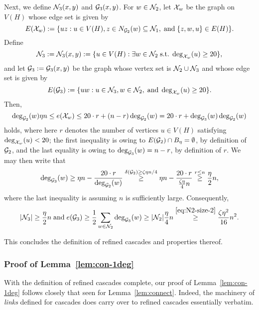 \documentclass[11pt,reqno]{amsart}
\begin{document}
Next, we define $\mathcal{N}_3(x,y)$ and $\mathcal{G}_3(x,y)$.
For $w \in \mathcal{N}_2$, let $\mathcal{X}_w$ be the graph on $V(H)$ whose edge set is given by 
$$
E(\mathcal{X}_w) := \{uz: u \in V(H), z \in N_{\mathcal{G}_2}(w) \subseteq \mathcal{N}_1, \; \text{and}\; \{z,w,u\}\in E(H)\}. 
$$ 
Define 
$$
\mathcal{N}_3:= \mathcal{N}_3(x,y) := \{u \in V(H): \exists w \in \mathcal{N}_2\; \text{s.t.} \; \deg_{\mathcal{X}_w}(u)\geq 20\},
$$
and let $\mathcal{G}_3:=\mathcal{G}_3(x,y)$ be the graph whose vertex set is $\mathcal{N}_2 \cup \mathcal{N}_3$ and whose edge set is given by 
$$
E(\mathcal{G}_3) := \{uw: u \in \mathcal{N}_3, w \in \mathcal{N}_2, \; \text{and}\; \deg_{\mathcal{X}_w}(u) \geq 20\}.
$$
Then,
$$
\deg_{\mathcal{G}_2}(w) \eta n \leq e(\mathcal{X}_w) \leq 20 \cdot r + (n-r) \deg_{\mathcal{G}_2}(w) = 20 \cdot r + \deg_{\mathcal{G}_3}(w)\deg_{\mathcal{G}_2}(w)
$$
holds, where here $r$ denotes the number of vertices $u \in V(H)$ satisfying $\deg_{\mathcal{X}_w}(u) < 20$; the first inequality is owing to $E(\mathcal{G}_2) \cap B_\eta =\emptyset$, by definition of $\mathcal{G}_2$, and the last equality is owing to $\deg_{\mathcal{G}_3}(w)=n-r$, by definition of $r$. We may then write that 
$$
\deg_{\mathcal{G}_3}(w) \geq \eta n - \frac{20\cdot r}{\deg_{\mathcal{G}_2}(w)} \overset{\delta(\mathcal{G}_2) \geq \zeta\eta n/4}{\geq} \eta n - \frac{20\cdot r}{\frac{\zeta \eta}{4} n} \overset{r \leq n}{\geq} \frac{\eta}{2} n,
$$ 
where the last inequality is assuming $n$ is sufficiently large. Consequently,
\begin{equation}\label{eq:G3-size-2}
|\mathcal{N}_3| \geq \frac{\eta}{2} n \; \text{and}\; e(\mathcal{G}_3) \geq \frac{1}{2} \sum_{w \in \mathcal{N}_2} \deg_{\mathcal{G}_3}(w) \geq |\mathcal{N}_2| \frac{\eta}{4}n \overset{\eqref{eq:N2-size-2}}{\geq} \frac{\zeta \eta^2}{16}{n^2}. 
\end{equation}



This concludes the definition of refined cascades and properties thereof. 


\subsubsection{Proof of Lemma~\ref{lem:con-1deg}}

With the definition of refined cascades complete, our proof of Lemma~\ref{lem:con-1deg} follows closely that seen for Lemma~\ref{lem:connect}.  Indeed, the machinery of {\sl links} defined for cascades does carry over to refined cascades essentially verbatim. 
\end{document}
